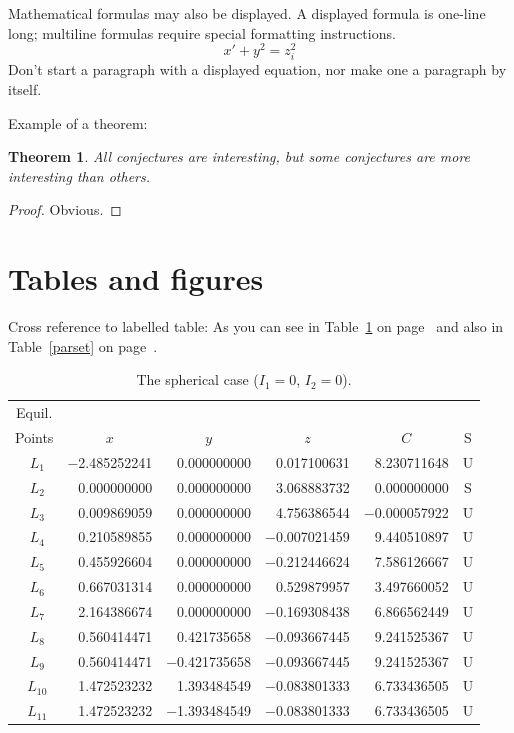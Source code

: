 \documentclass[ss]{imsart}
\numberwithin{equation}{section}
\theoremstyle{plain}
\newtheorem{thm}{Theorem}[section]
\begin{document}
Mathematical formulas may also be displayed.  A displayed formula is
one-line long; multiline formulas require special formatting
instructions.
   \[  x' + y^{2} = z_{i}^{2}\]
Don't start a paragraph with a displayed equation, nor make
one a paragraph by itself.

Example of a theorem:

\begin{thm}
All conjectures are interesting, but some conjectures are more
interesting than others.
\end{thm}

\begin{proof}
Obvious.
\end{proof}

\section{Tables and figures}
Cross reference to labelled table: As you can see in Table~\ref{sphericcase} on
page~\pageref{sphericcase} and also in Table~\ref{parset} on page~\pageref{parset}.

\begin{table}
\caption{The spherical case ($I_1=0$, $I_2=0$).}
\label{sphericcase}
\begin{tabular}{crrrrc}
\hline
Equil. \\
Points & \multicolumn{1}{c}{$x$} & \multicolumn{1}{c}{$y$} & \multicolumn{1}{c}{$z$} & \multicolumn{1}{c}{$C$} &
S \\
\hline
$~~L_1$ & $-$2.485252241 & 0.000000000 & 0.017100631 & 8.230711648 & U \\
$~~L_2$ &    0.000000000 & 0.000000000 & 3.068883732 & 0.000000000 & S \\
$~~L_3$ &    0.009869059 & 0.000000000 & 4.756386544 & $-$0.000057922 & U \\
$~~L_4$ &    0.210589855 & 0.000000000 & $-$0.007021459 & 9.440510897 & U \\
$~~L_5$ &    0.455926604 & 0.000000000 & $-$0.212446624 & 7.586126667 & U \\
$~~L_6$ &    0.667031314 & 0.000000000 & 0.529879957 & 3.497660052 & U \\
$~~L_7$ &    2.164386674 & 0.000000000 & $-$0.169308438 & 6.866562449 & U \\
$~~L_8$ &    0.560414471 & 0.421735658 & $-$0.093667445 & 9.241525367 & U \\
$~~L_9$ &    0.560414471 & $-$0.421735658 & $-$0.093667445 & 9.241525367 & U
\\
$~~L_{10}$ & 1.472523232 & 1.393484549 & $-$0.083801333 & 6.733436505 & U \\
$~~L_{11}$ & 1.472523232 & $-$1.393484549 & $-$0.083801333 & 6.733436505 & U
\\ \hline
\end{tabular}
\end{table}
\end{document}

